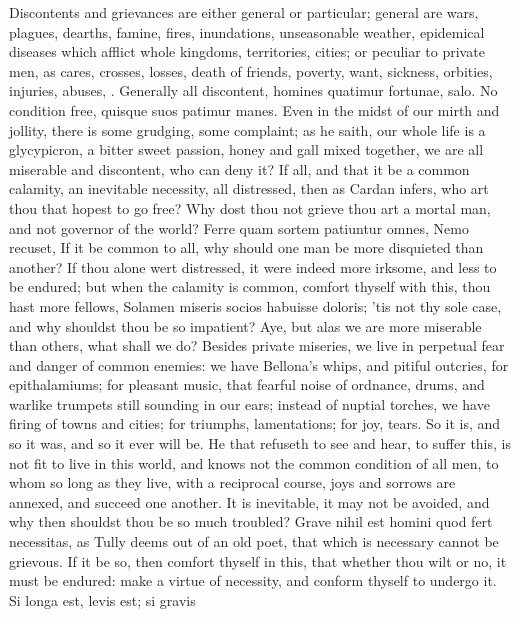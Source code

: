 {Discontents and grievances are either general or particular; general
are wars, plagues, dearths, famine, fires, inundations, unseasonable
weather, epidemical diseases which afflict whole kingdoms, territories,
cities; or peculiar to private men, as cares, crosses, losses,
death of friends, poverty, want, sickness, orbities, injuries, abuses,
\etc{}. Generally all discontent, homines quatimur fortunae, salo. No
condition free, quisque suos patimur manes. Even in the midst of our
mirth and jollity, there is some grudging, some complaint; as he
saith, our whole life is a glycypicron, a bitter sweet passion, honey
and gall mixed together, we are all miserable and discontent, who can
deny it? If all, and that it be a common calamity, an inevitable
necessity, all distressed, then as Cardan infers, who art thou
that hopest to go free? Why dost thou not grieve thou art a mortal man,
and not governor of the world? Ferre quam sortem patiuntur omnes, Nemo
recuset, If it be common to all, why should one man be more
disquieted than another? If thou alone wert distressed, it were indeed
more irksome, and less to be endured; but when the calamity is common,
comfort thyself with this, thou hast more fellows, Solamen miseris
socios habuisse doloris; 'tis not thy sole case, and why shouldst thou
be so impatient? Aye, but alas we are more miserable than others,
what shall we do? Besides private miseries, we live in perpetual fear
and danger of common enemies: we have Bellona's whips, and pitiful
outcries, for epithalamiums; for pleasant music, that fearful noise of
ordnance, drums, and warlike trumpets still sounding in our ears;
instead of nuptial torches, we have firing of towns and cities; for
triumphs, lamentations; for joy, tears. So it is, and so it was,
and so it ever will be. He that refuseth to see and hear, to suffer
this, is not fit to live in this world, and knows not the common
condition of all men, to whom so long as they live, with a reciprocal
course, joys and sorrows are annexed, and succeed one another. It is
inevitable, it may not be avoided, and why then shouldst thou be so
much troubled? Grave nihil est homini quod fert necessitas, as
Tully deems out of an old poet, that which is necessary cannot be
grievous. If it be so, then comfort thyself in this, that whether
thou wilt or no, it must be endured: make a virtue of necessity, and
conform thyself to undergo it. Si longa est, levis est; si gravis
}
